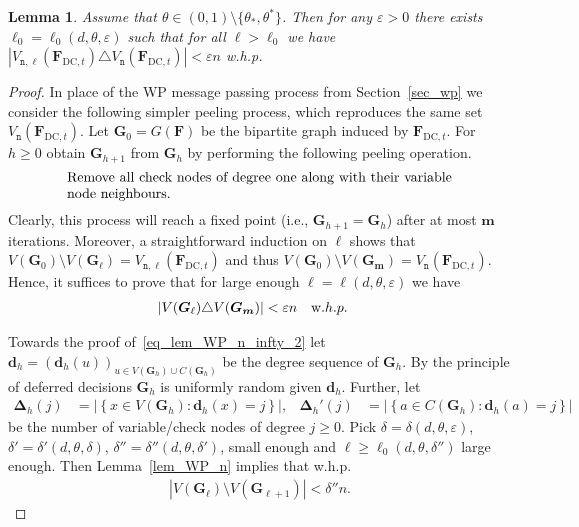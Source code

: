 \documentclass[10pt,reqno]{amsart}
\numberwithin{equation}{section}
\renewcommand{\vec}[1]{\boldsymbol{#1}}
\newcommand{\FDC}[1]{\PHI_{\mathrm{DC},{#1}}}
\newcommand{\nll}{\mathtt{n}}
\newcommand\PHI{\vec F}
\newcommand\vG{\vec G}
\newcommand\vd{\vec d}
\newcommand\vm{\vec m}
\newcommand\eps{\varepsilon}
\newcommand\cbc[1]{\left\{{#1}\right\}}
\newcommand\abs[1]{\left|{#1}\right|}
\newcommand{\whp}{w.h.p.}
\newcommand\Lem{Lemma}
\newcommand\Sec{Section}
\newtheorem{lemma}[definition]{Lemma}
\begin{document}
\begin{lemma}\label{lem_WP_n_infty}
	Assume that $\theta\in(0,1)\setminus\{\theta_*,\theta^*\}$.
	Then for any $\eps>0$ there exists $\ell_0=\ell_0(d,\theta, \eps)$ such that for all $\ell>\ell_0$ we have $|V_{\nll,\ell}(\FDC{t})\triangle V_{\nll}(\FDC{t})|<\eps n$ \whp
\end{lemma}
\begin{proof}
	In place of the WP message passing process from \Sec~\ref{sec_wp} we consider the following simpler peeling process, which reproduces the same set $V_{\nll}(\FDC t)$.
	Let $\vG_0=G(\PHI)$ be the bipartite graph induced by $\FDC t$.
	For $h\geq0$ obtain $\vG_{h+1}$ from $\vG_h$ by performing the following peeling operation.
	\begin{align}\label{eq_lem_WP_n_infty_1}
		\parbox{0.8\textwidth}{Remove all check nodes of degree one along with their variable node neighbours.}
	\end{align}
	Clearly, this process will reach a fixed point (i.e., $\vG_{h+1}=\vG_h$) after at most $\vm$ iterations.
	Moreover, a straightforward induction on $\ell$ shows that $V(\vG_0)\setminus V(\vG_\ell)=V_{\nll,\ell}(\FDC t)$ and thus $V(\vG_0)\setminus V(\vG_{\vm})=V_{\nll}(\FDC t)$.
	Hence, it suffices to prove that for large enough $\ell=\ell(d,\theta, \eps)$ we have
	\begin{align}\label{eq_lem_WP_n_infty_2}
		|V(\vG_{\ell})\triangle V(\vG_{\vm})|&<\eps n&&\mbox\whp
	\end{align}

	Towards the proof of~\eqref{eq_lem_WP_n_infty_2} let $\vd_h=(\vd_h(u))_{u\in V(\vG_h)\cup C(\vG_h)}$ be the degree sequence of $\vG_h$.
	By the principle of deferred decisions $\vG_h$ is uniformly random given $\vd_h$.
	Further, let
	\begin{align*}
		\vec\Delta_h(j)&=\abs{\cbc{x\in V(\vG_h):\vd_h(x)=j}},&
		\vec\Delta_h'(j)&=\abs{\cbc{a\in C(\vG_h):\vd_h(a)=j}}
	\end{align*}
	be the number of variable/check nodes of degree $j\geq0$.
	Pick $\delta=\delta(d,\theta,\eps)$, $\delta'=\delta'(d,\theta,\delta)$, $\delta'' = \delta''(d,\theta,\delta')$,  small enough and $\ell\geq\ell_0(d,\theta,\delta'')$ large enough.
	Then \Lem~\ref{lem_WP_n} implies that \whp \begin{align}\label{eq_lem_WP_n_infty_3}
		|V(\vG_{\ell})\setminus V(\vG_{\ell+1})|<\delta'' n.
\end{align}
	

\end{proof}
\end{document}
